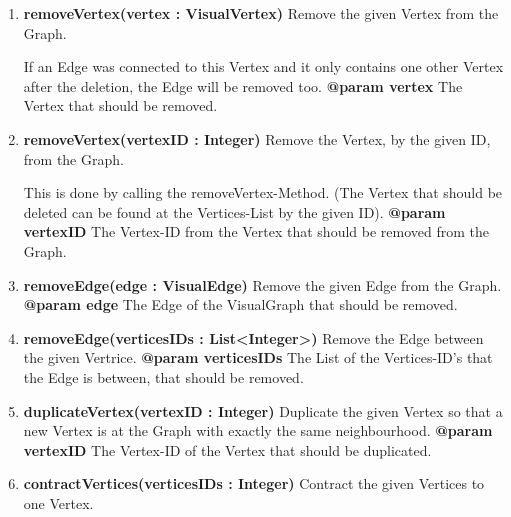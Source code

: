 \documentclass{article}
\begin{document}
\begin{enumerate}
{\begin{enumerate}[+]
{						This is done by creating an new VisualEdge-Object with the given List as Parameter and then calling the addEdge-Method.
						\newline
						\textbf{@param verticeIDs}
							The List of Vertice-ID's that should be connected by Edge that should be added.
							\newline
					}
					\item{
						\textbf{removeVertex(vertex : VisualVertex)} \newline
						Remove the given Vertex from the Graph.
						
						If an Edge was connected to this Vertex and it only contains one other Vertex after the deletion, the Edge will be removed too.
						\newline
						\textbf{@param vertex}
							The Vertex that should be removed.
							\newline
					}
					\item{
						\textbf{removeVertex(vertexID : Integer)} \newline
						Remove the Vertex, by the given ID, from the Graph.
						
						This is done by calling the removeVertex-Method.
						(The Vertex that should be deleted can be found at the Vertices-List by the given ID).
						\newline
						\textbf{@param vertexID}
							The Vertex-ID from the Vertex that should be removed from the Graph.
							\newline
					}
					\item{
						\textbf{removeEdge(edge : VisualEdge)} \newline
						Remove the given Edge from the Graph.
						\newline
						\textbf{@param edge}
							The Edge of the VisualGraph that should be removed.
							\newline
					}
					\item{
						\textbf{removeEdge(verticesIDs : List<Integer>)} \newline
						Remove the Edge between the given Vertrice.
						\newline
						\textbf{@param verticesIDs}
							The List of the Vertices-ID's that the Edge is between, that should be removed.
							\newline
					}
					\item{
						\textbf{duplicateVertex(vertexID : Integer)} \newline
						Duplicate the given Vertex so that a new Vertex is at the Graph with exactly the same neighbourhood.
						\newline
						\textbf{@param vertexID}
							The Vertex-ID of the Vertex that should be duplicated.
							\newline
					}
					\item{
						\textbf{contractVertices(verticesIDs : Integer)} \newline
						Contract the given Vertices to one Vertex.
						
}
\end{enumerate}}
\end{enumerate}
\end{document}
